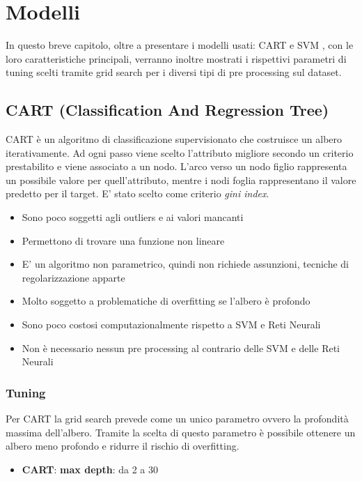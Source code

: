 \chapter{Modelli}
\label{ch:modelli}
In questo breve capitolo, oltre a presentare i modelli usati: CART e SVM \cite{cortes1995support}, con le loro caratteristiche principali, verranno inoltre mostrati i rispettivi parametri di tuning scelti tramite grid search per i diversi tipi di pre processing sul dataset.

\section{CART (Classification And Regression Tree)}
CART è un algoritmo di classificazione supervisionato che costruisce un albero iterativamente. Ad ogni passo viene scelto l'attributo migliore secondo un criterio prestabilito e viene associato a un nodo.
L'arco verso un nodo figlio rappresenta un possibile valore per quell'attributo, mentre i nodi foglia rappresentano il valore predetto per il target.
E' stato scelto come criterio \textit{gini index}.

\begin{itemize}
    \item Sono poco soggetti agli outliers e ai valori mancanti
    \item Permettono di trovare una funzione non lineare 
    \item E' un algoritmo non parametrico, quindi non richiede assunzioni, tecniche di regolarizzazione apparte
    \item Molto soggetto a problematiche di overfitting se l'albero è profondo
    \item Sono poco costosi computazionalmente rispetto a SVM e Reti Neurali
    \item Non è necessario nessun pre processing al contrario delle SVM e delle Reti Neurali
\end{itemize}

\newpage

\subsection*{Tuning}Per CART la grid search prevede come un unico parametro ovvero la profondità massima dell'albero. Tramite la scelta di questo parametro è possibile ottenere un albero meno profondo e ridurre il rischio di overfitting.

\begin{itemize}
    \item \textbf{CART}: \textbf{max depth}: da 2 a 30
\end{itemize}

